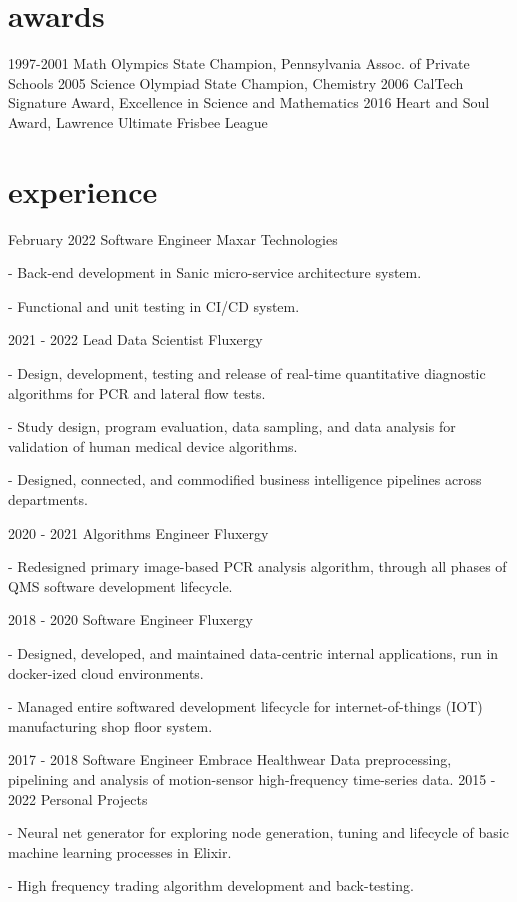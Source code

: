 \documentclass[]{twentysecondcv}
\begin{document}

\section{awards}

\begin{twentyshort}
  \twentyitemshort
    {1997-2001}
    {Math Olympics State Champion, Pennsylvania Assoc. of Private Schools}
  \twentyitemshort
    {2005}
    {Science Olympiad State Champion, Chemistry}
  \twentyitemshort
    {2006}
    {CalTech Signature Award, Excellence in Science and Mathematics}
  \twentyitemshort
    {2016}
    {Heart and Soul Award, Lawrence Ultimate Frisbee League}
\end{twentyshort}


\section{experience}

\begin{twenty}
  \twentyitem
    {February 2022}
    {Software Engineer}
    {Maxar Technologies}
    {- Back-end development in Sanic micro-service architecture system. 

        - Functional and unit testing in CI/CD system.
	
}

  \twentyitem
    {2021 - 2022}
    {Lead Data Scientist}
    {Fluxergy}
    {- Design, development, testing and release of real-time quantitative diagnostic algorithms for PCR and lateral flow tests.

	- Study design, program evaluation, data sampling, and data analysis for validation of human medical device algorithms.

	- Designed, connected, and commodified business intelligence pipelines across departments.
	} 
  \twentyitem
    {2020 - 2021}
    {Algorithms Engineer}
    {Fluxergy}
    {- Redesigned primary image-based PCR analysis algorithm, through all phases of QMS software development lifecycle.

	} 
  \twentyitem
    {2018 - 2020}
    {Software Engineer}
    {Fluxergy}
    {- Designed, developed, and maintained data-centric internal applications, run in docker-ized cloud environments.

	- Managed entire softwared development lifecycle for internet-of-things (IOT) manufacturing shop floor system.
	} 
  \twentyitem
    {2017 - 2018}
    {Software Engineer}
    {Embrace Healthwear}
    {Data preprocessing, pipelining and analysis of motion-sensor high-frequency time-series data.
	} 
  \twentyitem
    {2015 - 2022}
    {Personal Projects}
    {}
    {- Neural net generator for exploring node generation, tuning and lifecycle of basic machine learning processes in Elixir.

	- High frequency trading algorithm development and back-testing.} 
\end{twenty}
\end{document}

